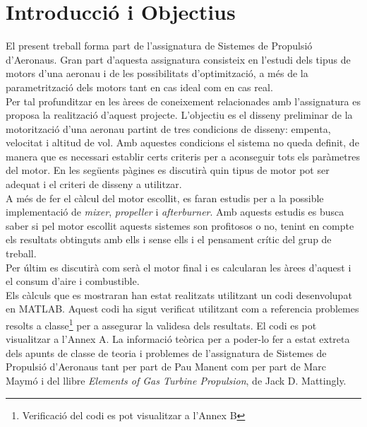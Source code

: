 \section{Introducció i Objectius}
El present treball forma part de l'assignatura de Sistemes de Propulsió d'Aeronaus. Gran part d'aquesta assignatura consisteix en l'estudi dels tipus de motors d'una aeronau i de les possibilitats d'optimització, a més de la parametrització dels motors tant en cas ideal com en cas real.\\
Per tal profunditzar en les àrees de coneixement relacionades amb l'assignatura es proposa la realització d'aquest projecte. L'objectiu es el disseny preliminar de la motorització d'una aeronau partint de tres condicions de disseny: empenta, velocitat i altitud de vol. Amb aquestes condicions el sistema no queda definit, de manera que es necessari establir certs criteris per a aconseguir tots els paràmetres del motor. En les següents pàgines es discutirà quin tipus de motor pot ser adequat i el criteri de disseny a utilitzar.\\
A més de fer el càlcul del motor escollit, es faran estudis per a la possible implementació de \textit{mixer}, \textit{propeller} i \textit{afterburner}. Amb aquests estudis es busca saber si pel motor escollit aquests sistemes son profitosos o no, tenint en compte els resultats obtinguts amb ells i sense ells i el pensament crític del grup de treball.\\
Per últim es discutirà com serà el motor final i es calcularan les àrees d'aquest i el consum d'aire i combustible.\\
Els càlculs que es mostraran han estat realitzats utilitzant un codi desenvolupat en MATLAB. Aquest codi ha sigut verificat utilitzant com a referencia problemes resolts a classe\footnote{Verificació del codi es pot visualitzar a l'Annex B} per a assegurar la validesa dels resultats. El codi es pot visualitzar a l'Annex A. La informació teòrica per a poder-lo fer a estat extreta dels apunts de classe de teoria i problemes de l'assignatura de Sistemes de Propulsió d'Aeronaus tant per part de Pau Manent com per part de Marc Maymó i del llibre \textit{Elements of Gas Turbine Propulsion}, de Jack D. Mattingly. 
